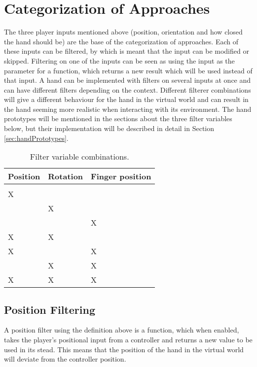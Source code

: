 \section{Categorization of Approaches}
\label{sec:categorizationOfApproaches}
The three player inputs mentioned above (position, orientation and how closed the hand should be) are the base of the categorization of approaches. Each of these inputs can be filtered, by which is meant that the input can be modified or skipped. Filtering on one of the inputs can be seen as using the input as the parameter for a function, which returns a new result which will be used instead of that input. A hand can be implemented with filters on several inputs at once and can have different filters depending on the context. Different filterer combinations will give a different behaviour for the hand in the virtual world and can result in the hand seeming more realistic when interacting with its environment. The hand prototypes will be mentioned in the sections about the three filter variables below, but their implementation will be described in detail in Section \ref{sec:handPrototypes}.

\begin{table}[H]
\centering
\caption{Filter variable combinations.}
\label{tab:filterVariableCombinations}
\begin{tabular}{C{2cm}C{2cm}C{2cm}}
Position & Rotation & Finger position \\ \midrule \midrule
				&					&					\\ \midrule
\Large X	&					&					\\ \midrule
				& \Large X	& 		                \\ \midrule
				&					& \Large X     \\ \midrule
\Large X	& \Large X	&					\\ \midrule
\Large X 	&					& \Large X	\\ \midrule
				& \Large X	& \Large X	\\ \midrule
\Large X 	& \Large X 	& \Large X
\end{tabular}
\end{table}

\subsection{Position Filtering}
\label{subsec:categoryPositionFiltering}
A position filter using the definition above is a function, which when enabled, takes the player's positional input from a controller and returns a new value to be used in its stead. This means that the position of the hand in the virtual world will deviate from the controller position.\\

